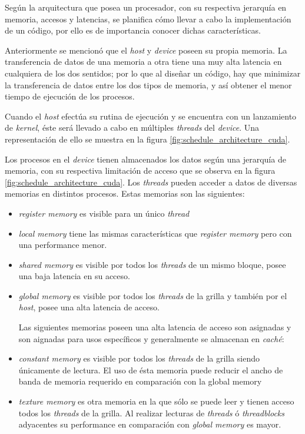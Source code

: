 Según la arquitectura que posea un procesador, con su respectiva jerarquía en memoria, accesos y latencias, se planifica cómo llevar a cabo la implementación de un código, por ello es de importancia conocer dichas características. 

Anteriormente se mencionó que el \textit{host} y \textit{device} poseen su propia memoria. La transferencia de datos de una memoria a otra tiene una muy alta latencia en cualquiera de los dos sentidos; por lo que al diseñar un código, hay que minimizar la transferencia de datos entre los dos tipos de memoria, y así obtener el menor tiempo de ejecución de los procesos.

Cuando el \textit{host} efectúa su rutina de ejecución y se encuentra con un lanzamiento de \textit{kernel}, éste será llevado a cabo en múltiples \textit{threads} del \textit{device}. Una representación de ello se muestra en la figura \ref{fig:schedule_architecture_cuda}. 

Los procesos en el \textit{device} tienen almacenados los datos según una jerarquía de memoria, con su respectiva limitación de acceso que se observa en la figura \ref{fig:schedule_architecture_cuda}. Los \textit{threads} pueden acceder a datos de diversas memorias en distintos procesos. Estas memorias son las siguientes:

\begin{itemize}
	\item  \textit{register memory} es visible para un único \textit{thread}
	\item \textit{local memory} tiene las mismas características que \textit{register memory} pero con una performance menor.
	\item \textit{shared memory} es visible por todos los \textit{threads} de un mismo bloque, posee una baja latencia en su acceso.
	\item \textit{global memory} es visible por todos los \textit{threads} de la grilla y también por el \textit{host}, posee una alta latencia de acceso.
	
	Las siguientes memorias poseen una alta latencia de acceso son asignadas y son aignadas para usos específicos y generalmente se almacenan en \textit{caché}:
	
	\item \textit{constant memory} es visible por todos los \textit{threads} de la grilla siendo únicamente de lectura. El uso de ésta memoria puede reducir el ancho de banda de memoria requerido en comparación con la {global memory}
	\item \textit{texture memory} es otra memoria en la que sólo se puede leer y tienen acceso todos los \textit{threads} de la grilla. Al realizar lecturas de \textit{threads} ó \textit{threadblocks} adyacentes su performance en comparación con \textit{global memory} es mayor. 
	
\end{itemize}


